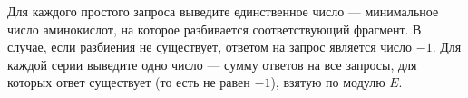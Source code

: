 Для каждого простого запроса выведите единственное число --- минимальное число аминокислот, на которое разбивается соответствующий фрагмент. В случае, если разбиения не существует, ответом на запрос является число $-1$. Для каждой серии выведите одно число --- сумму ответов на все запросы, для которых ответ существует (то есть не равен $-1$), взятую по модулю $E$.